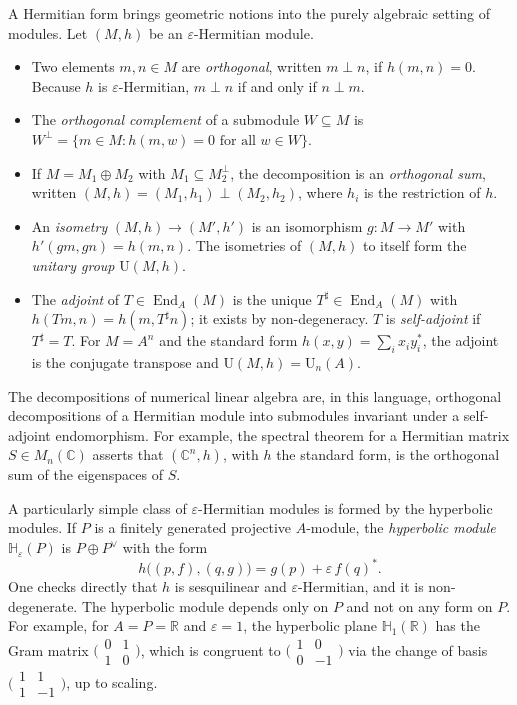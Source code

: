 \documentclass[12pt, a4paper]{report}
\theoremstyle{plain}
\theoremstyle{definition}
\theoremstyle{remark}
\theoremstyle{plain}
\newcommand{\RR}{\mathbb{R}}
\newcommand{\CC}{\mathbb{C}}
\newcommand{\Un}{\mathrm{U}}
\DeclareMathOperator{\End}{End}
\begin{document}
A Hermitian form brings geometric notions into the purely algebraic setting of modules. Let $(M,h)$ be an $\varepsilon$-Hermitian module.
\begin{itemize}
    \item Two elements $m, n \in M$ are \emph{orthogonal}, written $m \perp n$, if $h(m, n) = 0$. Because $h$ is $\varepsilon$-Hermitian, $m \perp n$ if and only if $n \perp m$.
    \item The \emph{orthogonal complement} of a submodule $W \subseteq M$ is $W^\perp = \{ m \in M : h(m, w) = 0 \text{ for all } w \in W \}$.
    \item If $M = M_1 \oplus M_2$ with $M_1 \subseteq M_2^\perp$, the decomposition is an \emph{orthogonal sum}, written $(M,h) = (M_1,h_1) \perp (M_2,h_2)$, where $h_i$ is the restriction of $h$.
    \item An \emph{isometry} $(M,h)\to(M',h')$ is an isomorphism $g:M\to M'$ with $h'(gm,gn)=h(m,n)$. The isometries of $(M,h)$ to itself form the \emph{unitary group} $\Un(M,h)$.
    \item The \emph{adjoint} of $T\in\End_A(M)$ is the unique $T^\sharp\in\End_A(M)$ with $h(Tm,n)=h(m,T^\sharp n)$; it exists by non-degeneracy. $T$ is \emph{self-adjoint} if $T^\sharp=T$. For $M=A^n$ and the standard form $h(x,y)=\sum_i x_iy_i^*$, the adjoint is the conjugate transpose and $\Un(M,h)=\Un_n(A)$.
\end{itemize}

The decompositions of numerical linear algebra are, in this language, orthogonal decompositions of a Hermitian module into submodules invariant under a self-adjoint endomorphism. For example, the spectral theorem for a Hermitian matrix $S\in M_n(\CC)$ asserts that $(\CC^n,h)$, with $h$ the standard form, is the orthogonal sum of the eigenspaces of $S$.

A particularly simple class of $\varepsilon$-Hermitian modules is formed by the hyperbolic modules. If $P$ is a finitely generated projective $A$-module, the \emph{hyperbolic module} $\mathbb{H}_\varepsilon(P)$ is $P\oplus P^\vee$ with the form
\[
  h\bigl((p,f),(q,g)\bigr) = g(p) + \varepsilon\, f(q)^* .
\]
One checks directly that $h$ is sesquilinear and $\varepsilon$-Hermitian, and it is non-degenerate. The hyperbolic module depends only on $P$ and not on any form on $P$. For example, for $A=P=\RR$ and $\varepsilon=1$, the hyperbolic plane $\mathbb{H}_1(\RR)$ has the Gram matrix $\bigl(\begin{smallmatrix}0&1\\1&0\end{smallmatrix}\bigr)$, which is congruent to $\bigl(\begin{smallmatrix}1&0\\0&-1\end{smallmatrix}\bigr)$ via the change of basis $\bigl(\begin{smallmatrix}1&1\\1&-1\end{smallmatrix}\bigr)$, up to scaling.
\end{document}
